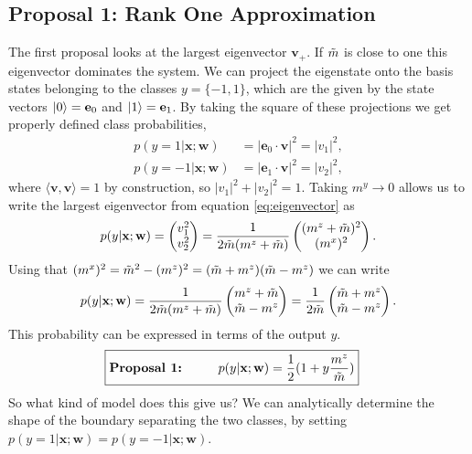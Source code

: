\subsection{Proposal 1: Rank One Approximation} 

The first proposal looks at the largest eigenvector $\mathbf{v}_+$. If $\Tilde{m}$ is close to one this eigenvector dominates the system. We can project the eigenstate onto the basis states belonging to the classes $y=\{-1,1\}$, which are the given by the state vectors $\ket{0}=\mathbf{e}_0$ and $\ket{1}=\mathbf{e}_1$. By taking the square of these projections we get properly defined class probabilities,
\begin{align}
    p(y=1|\mathbf{x};\mathbf{w}) &= |\mathbf{e}_0 \cdot \mathbf{v}|^2 = |v_1|^2 \label{eq:v1},\\
    p(y=-1|\mathbf{x};\mathbf{w}) &= |\mathbf{e}_1 \cdot \mathbf{v}|^2 = |v_2|^2 \label{eq:v2},
\end{align}
where $\langle \mathbf{v},\mathbf{v}\rangle = 1$ by construction, so $|v_1|^2 + |v_2|^2 = 1$. Taking $m^y\to0$ allows us to write the largest eigenvector from equation \ref{eq:eigenvector} as
\begin{align*}
p(y|\mathbf{x};\mathbf{w}) = 
    \begin{pmatrix}
        v_1^2\\
        v_2^2
    \end{pmatrix}    =
     \frac{1}{2\Tilde{m}(m^z + \Tilde{m})}
    \begin{pmatrix}
        (m^z + \Tilde{m})^2\\
        (m^x)^2
    \end{pmatrix}.
\end{align*}
Using that $(m^x)^2 = \Tilde{m}^2 - (m^z)^2 = (\Tilde{m} + m^z)(\Tilde{m} - m^z)$ we can write
\begin{align*}
   p(y|\mathbf{x};\mathbf{w}) = \frac{1}{2\Tilde{m}(m^z + \Tilde{m})}
    \begin{pmatrix}
        m^z + \Tilde{m}\\
        \Tilde{m} - m^z
    \end{pmatrix}
    =
    \frac{1}{2\Tilde{m}} 
    \begin{pmatrix}
        \Tilde{m} + m^z\\
        \Tilde{m} - m^z
    \end{pmatrix}.
\end{align*}
This probability can be expressed in terms of the output $y$.
\begin{align}
\Aboxed{
    \text{\textbf{Proposal 1:}\hspace{1cm}}  p(y|\mathbf{x};\mathbf{w}) = \frac{1}{2}(1+ y\frac{m^z}{\Tilde{m}})
    }
    \label{eq:prob_ev}
\end{align}
So what kind of model does this give us? We can analytically determine the shape of the boundary separating the two classes, by setting $p(y=1|\mathbf{x};\mathbf{w}) = p(y=-1|\mathbf{x};\mathbf{w})$. 

